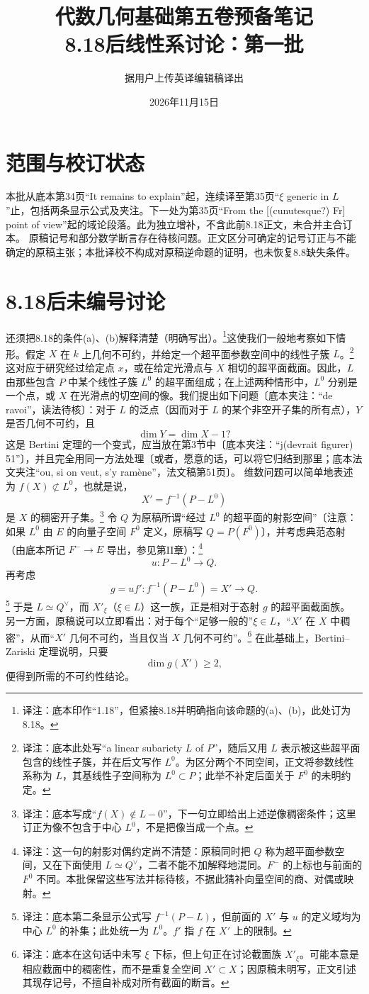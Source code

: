 \documentclass[openany]{ctexbook}
\title{代数几何基础第五卷预备笔记\\8.18后线性系讨论：第一批}
\author{据用户上传英译编辑稿译出}
\date{2026年11月15日}
\newcommand{\note}[1]{\footnote{译注：#1}}
\begin{document}
\maketitle
\chapter*{范围与校订状态}
本批从底本第34页“It remains to explain”起，连续译至第35页“$\xi$ generic in $L$”止，包括两条显示公式及夹注。下一处为第35页“From the [(cunutesque?) Fr] point of view”起的域论段落。此为独立增补，不含此前8.18正文，未合并主合订本。
原稿记号和部分数学断言存在待核问题。正文区分可确定的记号订正与不能确定的原稿主张；本批译校不构成对原稿逆命题的证明，也未恢复8.8缺失条件。
\chapter*{8.18后未编号讨论}
还须把8.18的条件(a)、(b)解释清楚（明确写出）。\note{底本印作“1.18”，但紧接8.18并明确指向该命题的(a)、(b)，此处订为8.18。}这使我们一般地考察如下情形。假定 $X$ 在 $k$ 上几何不可约，并给定一个超平面参数空间中的线性子簇 $L$。\note{底本此处写“a linear subariety $L$ of $P$”，随后又用 $L$ 表示被这些超平面包含的线性子簇，并在后文写作 $L^0$。为区分两个不同空间，正文将参数线性系称为 $L$，其基线性子空间称为 $L^0\subset P$；此举不补定后面关于 $F^0$ 的未明约定。}这对应于研究经过给定点 $x$，或在给定光滑点与 $X$ 相切的超平面截面。因此，$L$ 由那些包含 $P$ 中某个线性子簇 $L^0$ 的超平面组成；在上述两种情形中，$L^0$ 分别是一个点，或 $X$ 在光滑点的切空间的像。我们提出如下问题〔底本夹注：“de ravoi”，读法待核〕：对于 $L$ 的泛点（因而对于 $L$ 的某个非空开子集的所有点），$Y$ 是否几何不可约，且
\[
\dim Y=\dim X-1?
\]
这是 Bertini 定理的一个变式，应当放在第3节中〔底本夹注：“j(devrait figurer) 51”〕，并且完全用同一方法处理〔或者，愿意的话，可以将它归结到那里；底本法文夹注“ou, si on veut, s'y ramène”，法文稿第51页〕。
维数问题可以简单地表述为 $f(X)\not\subset L^0$，也就是说，
\[
X'=f^{-1}(P-L^0)
\]
是 $X$ 的稠密开子集。\note{底本写成“$f(X)\notin L-0$”，下一句立即给出上述逆像稠密条件；这里订正为像不包含于中心 $L^0$，不是把像当成一个点。}
令 $Q$ 为原稿所谓“经过 $L^0$ 的超平面的射影空间”〔注意：如果 $L^0$ 由 $E$ 的向量子空间 $F^0$ 定义，原稿写 $Q=P(F^0)$〕，并考虑典范态射（由底本所记 $F^-\to E$ 导出，参见第II章）：\note{这一句的射影对偶约定尚不清楚：原稿同时把 $Q$ 称为超平面参数空间，又在下面使用 $L\simeq Q^\vee$，二者不能不加解释地混同。$F^-$ 的上标也与前面的 $F^0$ 不同。本批保留这些写法并标待核，不据此猜补向量空间的商、对偶或映射。}
\[
u:P-L^0\longrightarrow Q.
\]
再考虑
\[
g=uf':f^{-1}(P-L^0)=X'\longrightarrow Q.
\]
\note{底本第二条显示公式写 $f^{-1}(P-L)$，但前面的 $X'$ 与 $u$ 的定义域均为中心 $L^0$ 的补集；此处统一为 $L^0$。$f'$ 指 $f$ 在 $X'$ 上的限制。}
于是 $L\simeq Q^\vee$，而 $X'_\xi$（$\xi\in L$）这一族，正是相对于态射 $g$ 的超平面截面族。
另一方面，原稿说可以立即看出：对于每个“足够一般的”$\xi\in L$，“$X'$ 在 $X$ 中稠密”，从而“$X'$ 几何不可约，当且仅当 $X$ 几何不可约”。\note{底本在这句话中未写 $\xi$ 下标，但上句正在讨论截面族 $X'_\xi$。可能本意是相应截面中的稠密性，而不是重复全空间 $X'\subset X$；因原稿未明写，正文引述其现存记号，不擅自补成对所有截面的断言。}
在此基础上，Bertini--Zariski 定理说明，只要
\[
\dim g(X')\ge2,
\]
便得到所需的不可约性结论。
\end{document}

